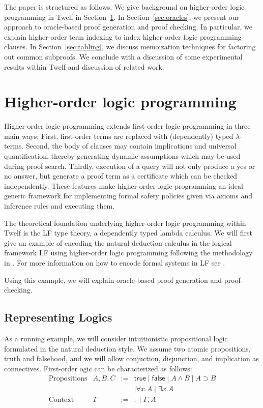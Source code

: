 \documentclass{acmconf}
\newcommand{\false}{\textsf{false}}
\newcommand{\true}{\textsf{true}}
\newcommand{\andl}{\wedge}
\newcommand{\impl}{\supset}
\newcommand{\ldot}{.\,}
\begin{document}
The paper is structured as follows. We give background on
higher-order logic programming in Twelf in Section~\ref{sec:twelf}. In
Section~\ref{sec:oracles}, we present our approach to oracle-based
proof generation and proof checking. In particular, we explain
higher-order term indexing to index higher-order logic programming
clauses. In Section~\ref{sec:tabling}, we discuss memoization techniques for
factoring out common subproofs. We conclude with a discussion of some
experimental results within Twelf and discussion of related work.

\section{Higher-order logic programming}\label{sec:twelf}

Higher-order logic programming extends first-order logic programming
in three main ways: First, first-order terms are replaced with
(dependently) typed $\lambda$-terms. Second, the body of clauses may
contain implications and universal quantification, thereby generating
dynamic assumptions which may be used during proof search. Thirdly,
execution of a query will not only produce a yes or no answer, but
generate a proof term as a certificate which can be checked
independently. These features make higher-order logic programming an
ideal generic framework for implementing formal safety policies given via
axioms and inference rules and executing them.

The theoretical foundation underlying higher-order logic programming
within Twelf is the LF type theory, a dependently typed lambda
calculus. We will first give an example of encoding the natural
deduction calculus in the logical framework LF using higher-order
logic programming following the methodology in  \cite{harper+:lf}. For
more information on how to encode formal systems in LF see
\cite{Pfenning97}. 

Using this example, we will explain oracle-based proof generation and
proof-checking. 

\subsection{Representing Logics}
As a running example, we will consider intuitionistic propositional
logic formulated in the natural deduction style. We assume two atomic
propositions, truth and falsehood, and we will allow conjuction,
disjunction, and implication as connectives. First-order ogic can be
characterized as follows: 
\[
\begin{array}{llll}
\mbox{Propositions} & A,B, C & := & \true \mid \false \mid A \andl B
\mid A \impl B \\
& & & \mid \forall x.A \mid \exists x.A\\
\mbox{Context} & \Gamma & := & \ldot \mid \Gamma,  A
\end{array}
\]
\end{document}
